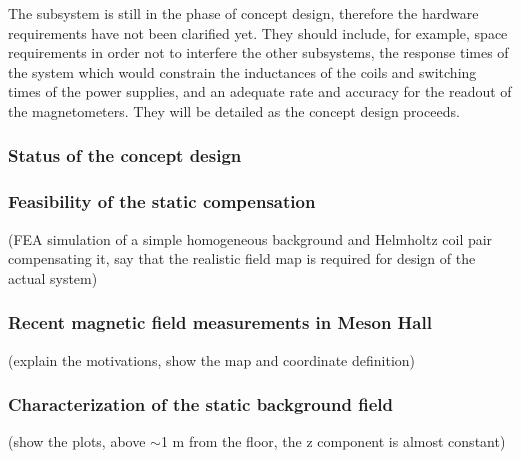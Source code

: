 The subsystem is still in the phase of concept design, therefore  the hardware requirements have not been clarified yet. 
They should include, for example, space requirements in order not to interfere the other subsystems, the response times of the system which would constrain the inductances of the coils and switching times of the power supplies, and an adequate rate and accuracy for the readout of the magnetometers. They will be detailed as the concept design proceeds. 


\subsubsection{Status of the concept design}
\subsubsection*{Feasibility of the static compensation}
(FEA simulation of a simple homogeneous background and Helmholtz coil pair compensating it, say that the realistic field map is required for design of the actual system)

\subsubsection*{Recent magnetic field measurements in Meson Hall}\label{sec:amc_recent}
(explain the motivations, show the map and coordinate definition)
\subsubsection*{Characterization of the static background field}
(show the plots, above $\sim$1 m from the floor, the z component is almost constant)
